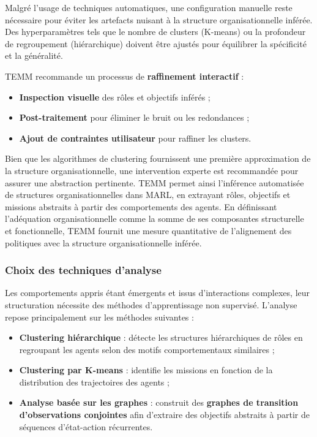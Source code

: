 \documentclass[pdflatex,sn-mathphys-num]{sn-jnl}%
\theoremstyle{thmstyleone}%
\theoremstyle{thmstyletwo}%
\theoremstyle{thmstylethree}%
\begin{document}
Malgré l'usage de techniques automatiques, une configuration manuelle reste nécessaire pour éviter les artefacts nuisant à la structure organisationnelle inférée. Des hyperparamètres tels que le nombre de clusters (K-means) ou la profondeur de regroupement (hiérarchique) doivent être ajustés pour équilibrer la spécificité et la généralité.

TEMM recommande un processus de \textbf{raffinement interactif} :
\begin{itemize}
    \item \textbf{Inspection visuelle} des rôles et objectifs inférés ;
    \item \textbf{Post-traitement} pour éliminer le bruit ou les redondances ;
    \item \textbf{Ajout de contraintes utilisateur} pour raffiner les clusters.
\end{itemize}

Bien que les algorithmes de clustering fournissent une première approximation de la structure organisationnelle, une intervention experte est recommandée pour assurer une abstraction pertinente.  
TEMM permet ainsi l'inférence automatisée de structures organisationnelles dans MARL, en extrayant rôles, objectifs et missions abstraits à partir des comportements des agents.  
En définissant l'adéquation organisationnelle comme la somme de ses composantes structurelle et fonctionnelle, TEMM fournit une mesure quantitative de l'alignement des politiques avec la structure organisationnelle inférée.

\subsubsection{Choix des techniques d'analyse}

Les comportements appris étant émergents et issus d'interactions complexes, leur structuration nécessite des méthodes d'apprentissage non supervisé. L'analyse repose principalement sur les méthodes suivantes :

\begin{itemize}
    \item \textbf{Clustering hiérarchique} : détecte les structures hiérarchiques de rôles en regroupant les agents selon des motifs comportementaux similaires ;
    \item \textbf{Clustering par K-means} : identifie les missions en fonction de la distribution des trajectoires des agents ;
    \item \textbf{Analyse basée sur les graphes} : construit des \textbf{graphes de transition d'observations conjointes} afin d'extraire des objectifs abstraits à partir de séquences d'état-action récurrentes.
\end{itemize}
\end{document}

